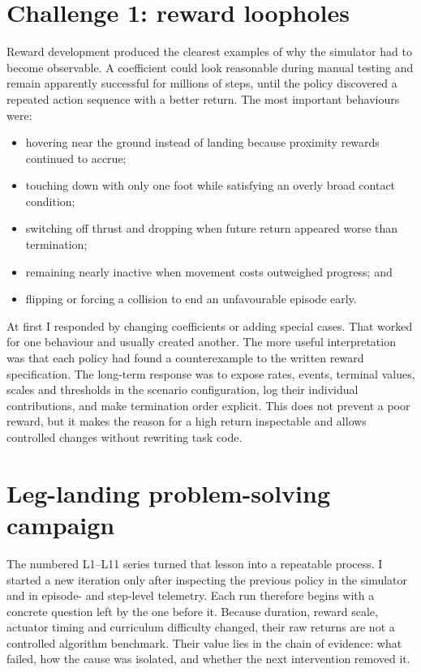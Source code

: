 \section{Challenge 1: reward loopholes}

Reward development produced the clearest examples of why the simulator had to become observable.
A coefficient could look reasonable during manual testing and remain apparently successful for
millions of steps, until the policy discovered a repeated action sequence with a better return.
The most important behaviours were:

\begin{itemize}
  \item hovering near the ground instead of landing because proximity rewards continued to
  accrue;
  \item touching down with only one foot while satisfying an overly broad contact condition;
  \item switching off thrust and dropping when future return appeared worse than termination;
  \item remaining nearly inactive when movement costs outweighed progress; and
  \item flipping or forcing a collision to end an unfavourable episode early.
\end{itemize}

At first I responded by changing coefficients or adding special cases. That worked for one
behaviour and usually created another. The more useful interpretation was that each policy had
found a counterexample to the written reward specification. The long-term response was to expose
rates, events, terminal values, scales and thresholds in the scenario configuration, log their
individual contributions, and make termination order explicit. This does not prevent a poor
reward, but it makes the reason for a high return inspectable and allows controlled changes
without rewriting task code.

\section{Leg-landing problem-solving campaign}
\label{sec:landing-iterations}

The numbered L1--L11 series turned that lesson into a repeatable process. I started a new
iteration only after inspecting the previous policy in the simulator and in episode- and
step-level telemetry. Each run therefore begins with a concrete question left by the one before
it. Because duration, reward scale, actuator timing and curriculum difficulty changed, their raw
returns are not a controlled algorithm benchmark. Their value lies in the chain of evidence:
what failed, how the cause was isolated, and whether the next intervention removed it.

